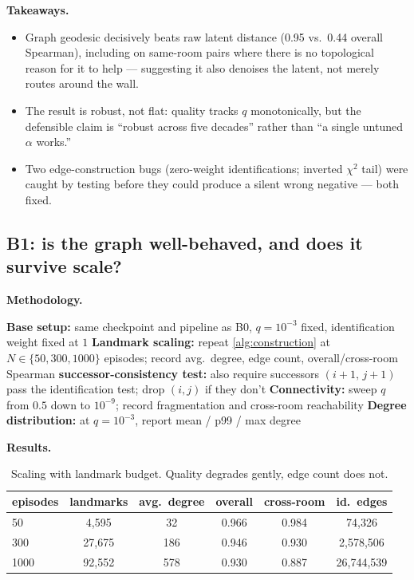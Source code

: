 \documentclass[11pt]{article}
\begin{document}
\textbf{Takeaways.}
\begin{itemize}[leftmargin=1.4em,itemsep=2pt]
\item Graph geodesic decisively beats raw latent distance (0.95 vs.\ 0.44 overall Spearman),
including on same-room pairs where there is no topological reason for it to help --- suggesting
it also denoises the latent, not merely routes around the wall.
\item The result is robust, not flat: quality tracks $q$ monotonically, but the defensible claim
is ``robust across five decades'' rather than ``a single untuned $\alpha$ works.''
\item Two edge-construction bugs (zero-weight identifications; inverted $\chi^2$ tail) were
caught by testing before they could produce a silent wrong negative --- both fixed.
\end{itemize}

\subsection{B1: is the graph well-behaved, and does it survive scale?}
\label{sec:b1-results}

\textbf{Methodology.}

\begin{algorithm}[H]
\caption{B1 methodology}
\begin{algorithmic}[1]
\State \textbf{Base setup:} same checkpoint and pipeline as B0, $q=10^{-3}$ fixed, identification weight fixed at $1$
\State \textbf{Landmark scaling:} repeat \cref{alg:construction} at $N \in \{50, 300, 1000\}$ episodes; record avg.\ degree, edge count, overall/cross-room Spearman
    \State \textbf{successor-consistency test:} also require successors $(i{+}1,\,j{+}1)$ pass the identification test; drop $(i,j)$ if they don't
\EndFor
\State \textbf{Connectivity:} sweep $q$ from $0.5$ down to $10^{-9}$; record fragmentation and cross-room reachability
\State \textbf{Degree distribution:} at $q=10^{-3}$, report mean / p99 / max degree
\end{algorithmic}
\end{algorithm}

\textbf{Results.}

\begin{table}[h]
\centering
\caption{Scaling with landmark budget. Quality degrades gently, edge count does not.}
\begin{tabular}{lccccc}
\toprule
episodes & landmarks & avg.\ degree & overall & cross-room & id.\ edges \\
\midrule
50   &  4{,}595 &  32 & 0.966 & 0.984 & 74{,}326 \\
300  & 27{,}675 & 186 & 0.946 & 0.930 & 2{,}578{,}506 \\
1000 & 92{,}552 & 578 & 0.930 & 0.887 & 26{,}744{,}539 \\
\bottomrule
\end{tabular}
\end{table}
\end{document}
